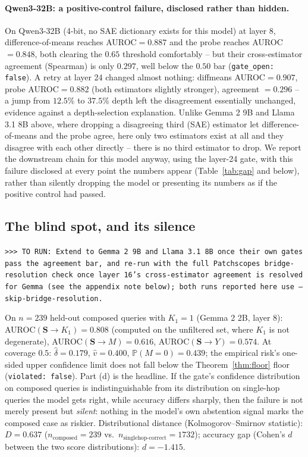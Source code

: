 \documentclass{article}
\newcommand{\TORUN}[1]{{\color{blue}\texttt{>{}>{}> TO RUN: #1}}}
\newcommand{\gate}{\mathbf{S}}
\begin{document}
\paragraph{Qwen3-32B: a positive-control failure, disclosed rather than hidden.} On Qwen3-32B
(4-bit, no SAE dictionary exists for this model) at layer 8, difference-of-means reaches
AUROC$=0.887$ and the probe reaches AUROC$=0.848$, both clearing the $0.65$ threshold comfortably --
but their cross-estimator agreement (Spearman) is only $0.297$, well below the $0.50$ bar
(\texttt{gate\_open: false}). A retry at layer 24 changed almost nothing: diffmeans
AUROC$=0.907$, probe AUROC$=0.882$ (both estimators slightly stronger), agreement $=0.296$ -- a jump
from $12.5\%$ to $37.5\%$ depth left the disagreement essentially unchanged, evidence against a
depth-selection explanation. Unlike Gemma 2 9B and Llama 3.1 8B above, where dropping a disagreeing
third (SAE) estimator let difference-of-means and the probe agree, here only two estimators exist at
all and they disagree with each other directly -- there is no third estimator to drop. We report the
downstream chain for this model anyway, using the layer-24 gate, with this failure disclosed at every
point the numbers appear (Table~\ref{tab:gap} and below), rather than silently dropping the model or
presenting its numbers as if the positive control had passed.

\subsection{The blind spot, and its silence}

\TORUN{Extend to Gemma 2 9B and Llama 3.1 8B once their own gates pass the agreement bar, and
re-run with the full Patchscopes bridge-resolution check once layer 16's cross-estimator agreement is
resolved for Gemma (see the appendix note below); both runs reported here use
\texttt{--skip-bridge-resolution}.}

On $n=239$ held-out composed queries with $K_1=1$ (Gemma 2 2B, layer 8): AUROC$(\gate\!\to\!K_1)=0.808$ (computed on the
unfiltered set, where $K_1$ is not degenerate), AUROC$(\gate\!\to\!M)=0.616$, AUROC$(\gate\!\to\!Y)=0.574$.
At coverage $0.5$: $\widehat\delta=0.179$, $\hat v=0.400$, $\mathbb{P}(M=0)=0.439$; the empirical risk's
one-sided upper confidence limit does not fall below the Theorem~\ref{thm:floor} floor
(\texttt{violated: false}). Part (d) is the headline. If the gate's confidence distribution on composed queries is
indistinguishable from its distribution on single-hop queries the model gets right, while accuracy
differs sharply, then the failure is not merely present but \emph{silent}: nothing in the model's own
abstention signal marks the composed case as riskier. Distributional distance (Kolmogorov--Smirnov
statistic): $D=0.637$ ($n_{\text{composed}}=239$ vs.\ $n_{\text{singlehop-correct}}=1732$); accuracy gap
(Cohen's $d$ between the two score distributions): $d=-1.415$.
\end{document}
